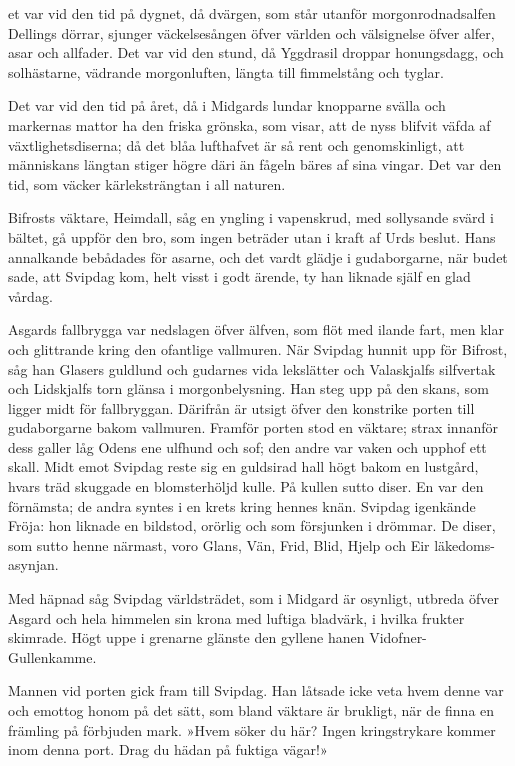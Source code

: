 
\dropcapD et var vid den tid på dygnet, då dvärgen, som står utanför
morgonrodnadsalfen Dellings dörrar, sjunger väckelsesången öfver världen
och välsignelse öfver alfer, asar och allfader. Det var vid den stund,
då Yggdrasil droppar honungsdagg, och solhästarne, vädrande
morgonluften, längta till fimmelstång och tyglar.

Det var vid den tid på året, då i Midgards lundar knopparne svälla och
markernas mattor ha den friska grönska, som visar, att de nyss blifvit
väfda af växtlighetsdiserna; då det blåa lufthafvet är så rent och
genomskinligt, att människans längtan stiger högre däri än fågeln bäres
af sina vingar. Det var den tid, som väcker kärleksträngtan i all
naturen.

Bifrosts väktare, Heimdall, såg en yngling i vapenskrud, med sollysande
svärd i bältet, gå uppför den bro, som ingen beträder utan i kraft af
Urds beslut. Hans annalkande bebådades för asarne, och det vardt glädje
i gudaborgarne, när budet sade, att Svipdag kom, helt visst i godt
ärende, ty han liknade själf en glad vårdag.

Asgards fallbrygga var nedslagen öfver älfven, som flöt med ilande fart,
men klar och glittrande kring den ofantlige vallmuren. När Svipdag
hunnit upp för Bifrost, såg han Glasers guldlund och gudarnes vida
lekslätter och Valaskjalfs silfvertak och Lidskjalfs torn glänsa i
morgonbelysning. Han steg upp på den skans, som ligger midt för
fallbryggan. Därifrån är utsigt öfver den konstrike porten till
gudaborgarne
bakom vallmuren. Framför porten stod en väktare; strax innanför dess
galler låg Odens ene ulfhund och sof; den andre var vaken och upphof ett
skall. Midt emot Svipdag reste sig en guldsirad hall högt bakom en
lustgård, hvars träd skuggade en blomsterhöljd kulle. På kullen sutto
diser. En var den förnämsta; de andra syntes i en krets kring hennes
knän. Svipdag igenkände Fröja: hon liknade en bildstod, orörlig och som
försjunken i drömmar. De diser, som sutto henne närmast, voro Glans,
Vän, Frid, Blid, Hjelp och Eir läkedoms-asynjan.

Med häpnad såg Svipdag världsträdet, som i Midgard är osynligt, utbreda
öfver Asgard och hela himmelen sin krona med luftiga bladvärk, i hvilka
frukter skimrade. Högt uppe i grenarne glänste den gyllene hanen
Vidofner-Gullenkamme.

Mannen vid porten gick fram till Svipdag. Han låtsade icke veta hvem
denne var och emottog honom på det sätt, som bland väktare är brukligt,
när de finna en främling på förbjuden mark. »Hvem söker du här? Ingen
kringstrykare kommer inom denna port. Drag du hädan på fuktiga vägar!»

